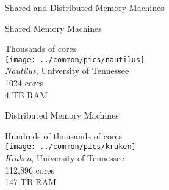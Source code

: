 \begin{frame}
  \begin{block}{Shared and Distributed Memory Machines}
   \begin{center}
    \begin{minipage}[t]{.47\textwidth}
    \begin{block}{Shared Memory Machines}
    \begin{center}
    Thousands of cores\\[.2cm]
    \texttt{[image: ../common/pics/nautilus]}\\
    {\tiny \emph{Nautilus}, University of Tennessee\\1024 cores \\4 TB RAM\\}
    \end{center}
    \end{block}
    \end{minipage}
    \hspace{.1cm}
    \begin{minipage}[t]{.47\textwidth}
    \begin{block}{Distributed Memory Machines}
    \begin{center}
    Hundreds of thousands of cores\\[.2cm]
    \texttt{[image: ../common/pics/kraken]}\\
    {\tiny \emph{Kraken}, University of Tennessee\\ 112,896 cores \\147 TB 
RAM\\}
    \end{center}
    \end{block}
    \end{minipage}
    \end{center}
    \end{block}
\end{frame}
